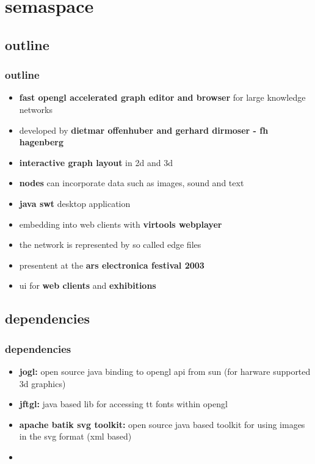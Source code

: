 \documentclass[blue]{beamer}
\begin{document}


\section{semaspace}
\subsection{outline}
\frame
{
\frametitle{\textbf{outline}}
\begin{itemize}
	\item \textbf{fast opengl accelerated graph editor and browser} for large knowledge networks
	\item developed by \textbf{dietmar offenhuber and gerhard dirmoser - fh hagenberg}
	\item \textbf{interactive graph layout} in 2d and 3d
	\item \textbf{nodes} can incorporate data such as images, sound and text
	\item \textbf{java swt} desktop application
	\item embedding into web clients with \textbf{virtools webplayer}
	\item the network is represented by so called edge files
	\item presentent at the \textbf{ars electronica festival 2003}
	\item ui for \textbf{web clients} and \textbf{exhibitions}
\end{itemize}
}

\subsection{dependencies}
\frame
{
\frametitle{\textbf{dependencies}}
\begin{itemize}
	\item \textbf{jogl:} open source java binding to opengl api from sun (for harware supported 3d graphics)
	\item \textbf{jftgl:} java based lib for accessing tt fonts within opengl
	\item \textbf{apache batik svg toolkit:} open source java based toolkit for using images in the svg format (xml based)
	\item \textbf{}
\end{itemize}
}
\end{document}
